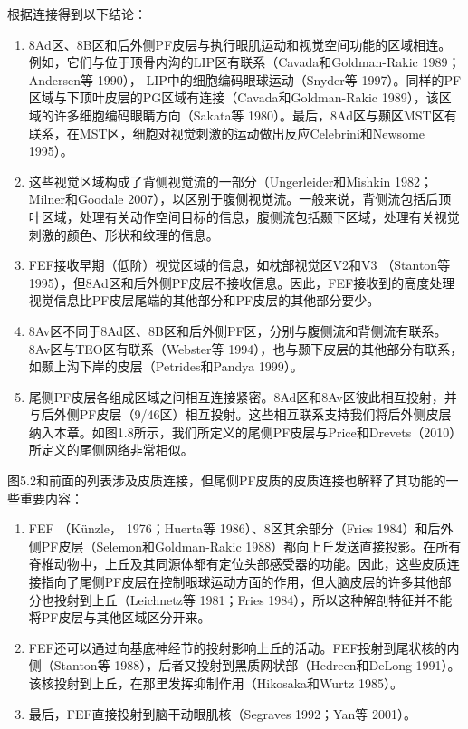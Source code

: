 根据连接得到以下结论：

\begin{enumerate}
	\item 8Ad区、8B区和后外侧PF皮层与执行眼肌运动和视觉空间功能的区域相连。例如，它们与位于顶骨内沟的LIP区有联系（Cavada和Goldman-Rakic 1989；Andersen等 1990）， LIP中的细胞编码眼球运动（Snyder等 1997）。同样的PF区域与下顶叶皮层的PG区域有连接（Cavada和Goldman-Rakic 1989），该区域的许多细胞编码眼睛方向（Sakata等 1980）。最后，8Ad区与颞区MST区有联系，在MST区，细胞对视觉刺激的运动做出反应Celebrini和Newsome 1995）。
	\item 这些视觉区域构成了背侧视觉流的一部分（Ungerleider和Mishkin 1982；Milner和Goodale 2007），以区别于腹侧视觉流。一般来说，背侧流包括后顶叶区域，处理有关动作空间目标的信息，腹侧流包括颞下区域，处理有关视觉刺激的颜色、形状和纹理的信息。
	\item FEF接收早期（低阶）视觉区域的信息，如枕部视觉区V2和V3 （Stanton等 1995），但8Ad区和后外侧PF皮层不接收信息。因此，FEF接收到的高度处理视觉信息比PF皮层尾端的其他部分和PF皮层的其他部分要少。
	\item 8Av区不同于8Ad区、8B区和后外侧PF区，分别与腹侧流和背侧流有联系。8Av区与TEO区有联系（Webster等 1994），也与颞下皮层的其他部分有联系，如颞上沟下岸的皮层（Petrides和Pandya 1999）。
	\item 尾侧PF皮层各组成区域之间相互连接紧密。8Ad区和8Av区彼此相互投射，并与后外侧PF皮层（9/46区）相互投射。这些相互联系支持我们将后外侧皮层纳入本章。如图1.8所示，我们所定义的尾侧PF皮层与Price和Drevets（2010）所定义的尾侧网络非常相似。
\end{enumerate}

图5.2和前面的列表涉及皮质连接，但尾侧PF皮质的皮质连接也解释了其功能的一些重要内容：

\begin{enumerate}
	\item FEF （Künzle， 1976；Huerta等 1986）、8区其余部分（Fries 1984）和后外侧PF皮层（Selemon和Goldman-Rakic 1988）都向上丘发送直接投影。在所有脊椎动物中，上丘及其同源体都有定位头部感受器的功能。因此，这些皮质连接指向了尾侧PF皮层在控制眼球运动方面的作用，但大脑皮层的许多其他部分也投射到上丘（Leichnetz等 1981；Fries 1984），所以这种解剖特征并不能将PF皮层与其他区域区分开来。
	\item FEF还可以通过向基底神经节的投射影响上丘的活动。FEF投射到尾状核的内侧（Stanton等 1988），后者又投射到黑质网状部（Hedreen和DeLong 1991）。该核投射到上丘，在那里发挥抑制作用（Hikosaka和Wurtz 1985）。
	\item 最后，FEF直接投射到脑干动眼肌核（Segraves 1992；Yan等 2001）。
\end{enumerate}

